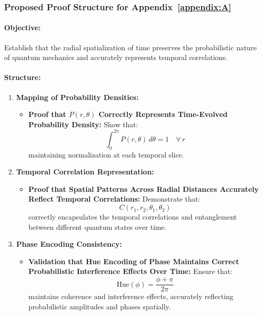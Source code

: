 \documentclass[12pt]{article}
\begin{document}
\subsubsection{Proposed Proof Structure for Appendix~\ref{appendix:A}}
\paragraph{Objective:} Establish that the radial spatialization of time preserves the probabilistic nature of quantum mechanics and accurately represents temporal correlations.

\paragraph{Structure:}
\begin{enumerate}
    \item \textbf{Mapping of Probability Densities:}
    \begin{itemize}
        \item \textbf{Proof that \(P(r, \theta)\) Correctly Represents Time-Evolved Probability Density:}
        Show that:
        \[
        \int_{0}^{2\pi} P(r, \theta) \, d\theta = 1 \quad \forall \, r
        \]
        maintaining normalization at each temporal slice.
    \end{itemize}
    
    \item \textbf{Temporal Correlation Representation:}
    \begin{itemize}
        \item \textbf{Proof that Spatial Patterns Across Radial Distances Accurately Reflect Temporal Correlations:}
        Demonstrate that:
        \[
        C(r_1, r_2, \theta_1, \theta_2)
        \]
        correctly encapsulates the temporal correlations and entanglement between different quantum states over time.
    \end{itemize}
    
    \item \textbf{Phase Encoding Consistency:}
    \begin{itemize}
        \item \textbf{Validation that Hue Encoding of Phase Maintains Correct Probabilistic Interference Effects Over Time:}
        Ensure that:
        \[
        \text{Hue}(\phi) = \dfrac{\phi + \pi}{2\pi}
        \]
        maintains coherence and interference effects, accurately reflecting probabilistic amplitudes and phases spatially.
    \end{itemize}
    

\end{enumerate}
\end{document}
